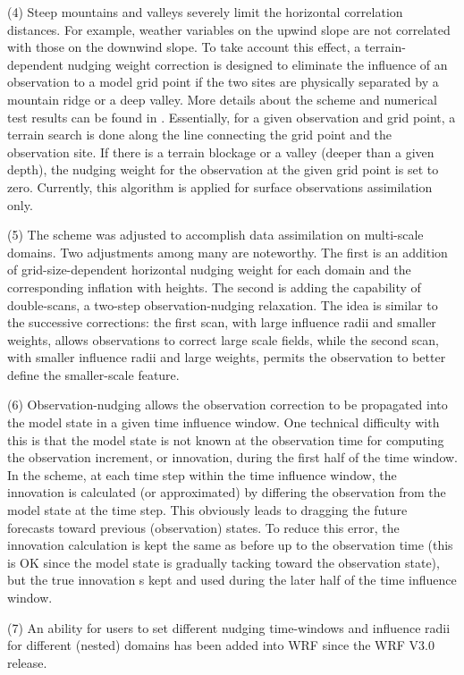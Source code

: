 (4) Steep mountains and valleys severely limit the horizontal correlation distances. For example, weather variables on the upwind slope are not correlated with those on the downwind slope. To take account this effect, a terrain-dependent nudging weight correction is designed to eliminate the influence of an observation to a model grid point if the two sites are physically separated by a mountain ridge or a deep valley. More details about the scheme and numerical test results can be found in \citet{xu02}. Essentially, for a given observation and grid point, a terrain search is done along the line connecting the grid point and the observation site. If there is a terrain blockage or a valley (deeper than a given depth), the nudging weight for the observation at the given grid point is set to zero. Currently, this algorithm is applied for surface observations assimilation only.  

(5) The scheme was adjusted to accomplish data assimilation on multi-scale domains. Two adjustments among many are noteworthy. The first is an addition of grid-size-dependent horizontal nudging weight for each domain and the corresponding inflation with heights.  The second is adding the capability of double-scans, a two-step observation-nudging relaxation. The idea is similar to the successive corrections: the first scan, with large influence radii and smaller weights, allows observations to correct large scale fields, while the second scan, with smaller influence radii and large weights, permits the observation to better define the smaller-scale feature. 

(6) Observation-nudging allows the observation correction to be propagated into the model state in a given time influence window. One technical difficulty with this is that the model state is not known at the observation time for computing the observation increment, or innovation, during the first half of the time window. In the \citet{stauffer94} scheme, at each time step within the time influence window, the innovation is calculated (or approximated) by differing the observation from the model state at the time step. This obviously leads to dragging the future forecasts toward previous (observation) states. To reduce this error, the innovation calculation is kept the same as before up to the observation time (this is OK since the model state is gradually tacking toward the observation state), but the true innovation s kept and used during the later half of the time influence window.  

(7) An ability for users to set different nudging time-windows and influence radii for different (nested) domains has been added into WRF since the WRF V3.0 release. 
 

